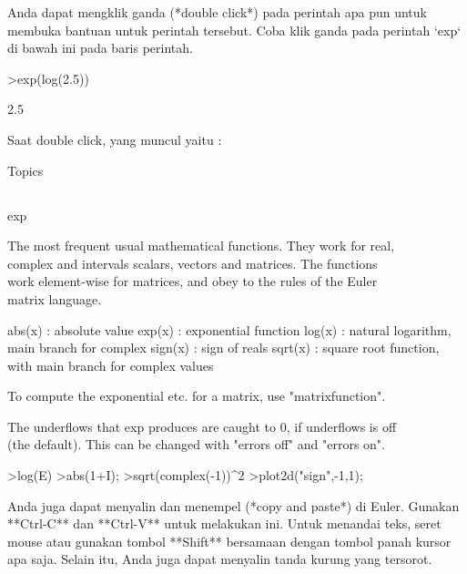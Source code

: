 \documentclass{article}
\newenvironment{eulernotebook}{\par}{\par}
\newcommand{\eulersubheading}[1]{\subsection{#1}}
\newenvironment{eulercomment}{\par\medskip}{\par\medskip}
\begin{document}
\begin{eulernotebook}
\begin{eulercomment}
Anda dapat mengklik ganda (*double click*) pada perintah apa pun untuk
membuka bantuan untuk perintah tersebut. Coba klik ganda pada perintah
`exp` di bawah ini pada baris perintah.
\end{eulercomment}
\begin{eulerprompt}
>exp(log(2.5))
\end{eulerprompt}
\begin{euleroutput}
  2.5
\end{euleroutput}
\begin{eulercomment}
Saat double click, yang muncul yaitu :

Topics\\
\end{eulercomment}
\eulersubheading{}
\begin{eulercomment}
exp

The most frequent usual mathematical functions. They work for real,\\
complex and intervals scalars, vectors and matrices. The functions\\
work element-wise for matrices, and obey to the rules of the Euler\\
matrix language.

\end{eulercomment}
\begin{eulerttcomment}
  abs(x) : absolute value
  exp(x) : exponential function
  log(x) : natural logarithm, main branch for complex
  sign(x) : sign of reals
  sqrt(x) : square root function, with main branch for complex values
\end{eulerttcomment}
\begin{eulercomment}

To compute the exponential etc. for a matrix, use "matrixfunction".

The underflows that exp produces are caught to 0, if underflows is off\\
(the default). This can be changed with "errors off" and "errors on". 

\end{eulercomment}
\begin{eulerttcomment}
  >log(E)
  >abs(1+I);
  >sqrt(complex(-1))^2
  >plot2d("sign",-1,1);
\end{eulerttcomment}
\begin{eulercomment}
Anda juga dapat menyalin dan menempel (*copy and paste*) di Euler.
Gunakan **Ctrl-C** dan **Ctrl-V** untuk melakukan ini. Untuk menandai
teks, seret mouse atau gunakan tombol **Shift** bersamaan dengan
tombol panah kursor apa saja. Selain itu, Anda juga dapat menyalin
tanda kurung yang tersorot.
\end{eulercomment}
\begin{eulercomment}


\end{eulercomment}
\end{eulernotebook}
\end{document}

